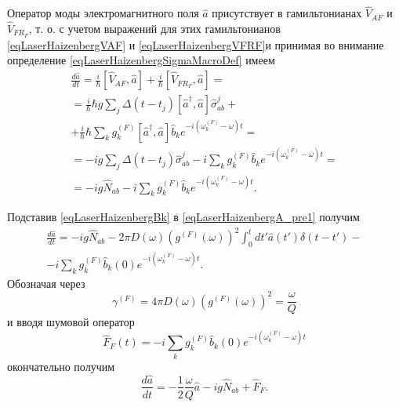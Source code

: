 Оператор моды электромагнитного поля $\hat{a}$ присутствует в
гамильтонианах $\hat{V}_{AF}$ и $\hat{V}_{FR_F}$, т. о.  с учетом
выражений для этих гамильтонианов \eqref{eqLaserHaizenbergVAF} и 
\eqref{eqLaserHaizenbergVFRF}и принимая во внимание определение
\eqref{eqLaserHaizenbergSigmaMacroDef} имеем 
\begin{eqnarray}
\frac{d \hat{a}}{d t} = \frac{i}{\hbar}
\left[\hat{V}_{AF}, \hat{a}\right] + 
\frac{i}{\hbar}
\left[\hat{V}_{FR_F}, \hat{a}\right] = 
\nonumber \\
= \frac{i}{\hbar}\hbar g
\sum_j
\Delta\left(t - t_j\right) 
\left[\hat{a}^{\dag},\hat{a}\right]\hat{\sigma}^{j}_{ab} +
\nonumber \\
+ 
\frac{i}{\hbar}\hbar
\sum_k
g_k^{(F)}
\left[\hat{a}^{\dag},\hat{a}\right]\hat{b}_k e^{-i\left(\omega_k^{(F)} -
  \omega\right)t} = 
\nonumber \\
= -i g 
\sum_j
\Delta\left(t - t_j\right) \hat{\sigma}^{j}_{ab} -
i \sum_k
g_k^{(F)}\hat{b}_k e^{-i\left(\omega_k^{(F)} -
  \omega\right)t} =
\nonumber \\ 
= -i g \hat{N}_{ab} -
i \sum_k
g_k^{(F)}\hat{b}_k e^{-i\left(\omega_k^{(F)} -
  \omega\right)t}.
\label{eqLaserHaizenbergA_pre1}
\end{eqnarray}

Подставив \eqref{eqLaserHaizenbergBk} в
\eqref{eqLaserHaizenbergA_pre1} получим
\begin{eqnarray}
\frac{d \hat{a}}{d t} = 
-i g \hat{N}_{ab}
- 2 \pi
D\left(\omega\right) \left(g^{(F)}\left(\omega\right)\right)^2
\int_0^td t' \hat{a}\left(t'\right)\delta\left(t - t'\right) - 
\nonumber \\
-
i
\sum_k
g_k^{(F)}\hat{b}_k \left(0\right)e^{-i\left(\omega_k^{(F)} -
  \omega\right)t}.
\nonumber
\end{eqnarray}
Обозначая через 
\[
\gamma^{(F)} = 4 \pi
D\left(\omega\right) \left(g^{(F)}\left(\omega\right)\right)^2 = \frac{\omega}{Q}
\]
и вводя шумовой оператор
\begin{equation}
\hat{F}_F\left(t\right) = - i
\sum_k
g_k^{(F)}\hat{b}_k \left(0\right)e^{-i\left(\omega_k^{(F)} -
  \omega\right)t}
\label{eqLaserHaizenbergFF}
\end{equation}
окончательно получим
\begin{equation}
\frac{d \hat{a}}{d t} = 
- \frac{1}{2}\frac{\omega}{Q}\hat{a}
-i g \hat{N}_{ab} + 
\hat{F}_F.
\label{eqLaserHaizenbergA}
\end{equation}


